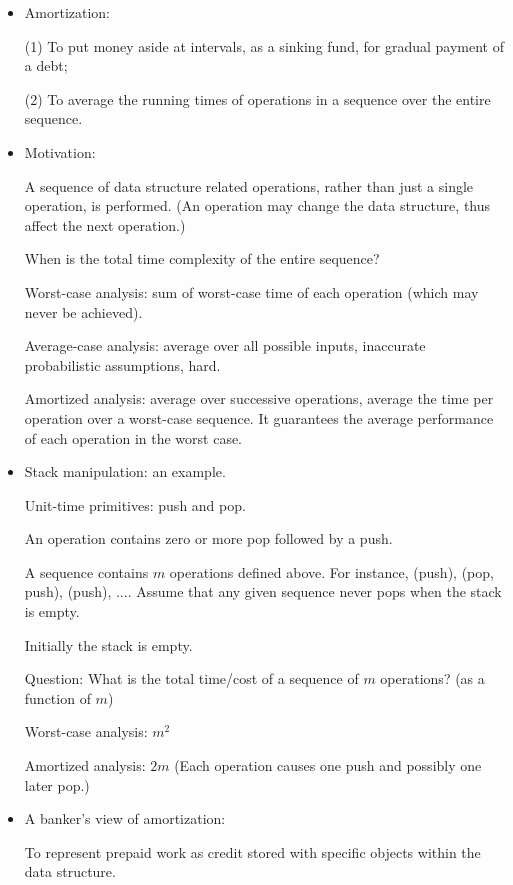 \documentclass{article}
\begin{document}

\begin{itemize}

\item Amortization:

(1) To put money aside at intervals, as a sinking fund, for gradual payment
of a debt;

(2) To average the running times of operations in a sequence over the
entire sequence.

\item Motivation:

A sequence of data structure related operations, rather than just a single
operation, is performed. (An operation may change the data structure, thus
affect the next operation.) 

When is the total time complexity of the entire sequence?

Worst-case analysis: sum of worst-case time of each operation (which may
never be achieved).

Average-case analysis: average over all possible inputs, 
inaccurate probabilistic assumptions, hard.

Amortized analysis: average over successive operations,
average the time per operation over a worst-case sequence.
It guarantees the average performance of each operation in the worst case.

\item Stack manipulation: an example.

Unit-time primitives: push and pop.

An operation contains zero or more pop followed by a push.

A sequence contains $m$ operations defined above. For instance,
(push), (pop, push), (push), .... Assume that any given sequence
never pops when the stack is empty.

Initially the stack is empty.

Question: What is the total time/cost of a sequence of $m$ operations?
(as a function of $m$)

Worst-case analysis: $m^2$

Amortized analysis: $2m$ (Each operation causes one push and possibly
one later pop.)

\item A banker's view of amortization:

To represent prepaid work as credit stored with specific
objects within the data structure.


\end{itemize}
\end{document}
